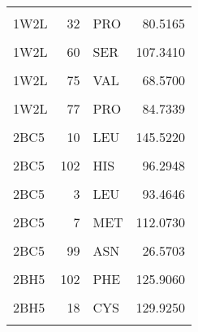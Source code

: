 \begin{table}
\begin{tabular}{lrlr}
			\cellcolor{gray!6}{1W2L} & \cellcolor{gray!6}{22} & \cellcolor{gray!6}{HIS} & \cellcolor{gray!6}{122.1140}\\
			1W2L & 32 & PRO & 80.5165\\
			\cellcolor{gray!6}{1W2L} & \cellcolor{gray!6}{34} & \cellcolor{gray!6}{PHE} & \cellcolor{gray!6}{94.2433}\\
			1W2L & 60 & SER & 107.3410\\
			\cellcolor{gray!6}{1W2L} & \cellcolor{gray!6}{61} & \cellcolor{gray!6}{ILE} & \cellcolor{gray!6}{64.6202}\\
			\addlinespace
			1W2L & 75 & VAL & 68.5700\\
			\cellcolor{gray!6}{1W2L} & \cellcolor{gray!6}{76} & \cellcolor{gray!6}{MET} & \cellcolor{gray!6}{95.5351}\\
			1W2L & 77 & PRO & 84.7339\\
			\cellcolor{gray!6}{1W2L} & \cellcolor{gray!6}{80} & \cellcolor{gray!6}{TYR} & \cellcolor{gray!6}{159.9880}\\
			2BC5 & 10 & LEU & 145.5220\\
			\addlinespace
			\cellcolor{gray!6}{2BC5} & \cellcolor{gray!6}{101} & \cellcolor{gray!6}{CYS} & \cellcolor{gray!6}{122.7380}\\
			2BC5 & 102 & HIS & 96.2948\\
			\cellcolor{gray!6}{2BC5} & \cellcolor{gray!6}{106} & \cellcolor{gray!6}{ARG} & \cellcolor{gray!6}{119.2950}\\
			2BC5 & 3 & LEU & 93.4646\\
			\cellcolor{gray!6}{2BC5} & \cellcolor{gray!6}{65} & \cellcolor{gray!6}{PHE} & \cellcolor{gray!6}{87.4034}\\
			\addlinespace
			2BC5 & 7 & MET & 112.0730\\
			\cellcolor{gray!6}{2BC5} & \cellcolor{gray!6}{98} & \cellcolor{gray!6}{CYS} & \cellcolor{gray!6}{83.1994}\\
			2BC5 & 99 & ASN & 26.5703\\
			\cellcolor{gray!6}{2BH5} & \cellcolor{gray!6}{100} & \cellcolor{gray!6}{LYS} & \cellcolor{gray!6}{174.4600}\\
			2BH5 & 102 & PHE & 125.9060\\
			\addlinespace
			\cellcolor{gray!6}{2BH5} & \cellcolor{gray!6}{15} & \cellcolor{gray!6}{CYS} & \cellcolor{gray!6}{93.4388}\\
			2BH5 & 18 & CYS & 129.9250\\
			\cellcolor{gray!6}{2BH5} & \cellcolor{gray!6}{19} & \cellcolor{gray!6}{HIS} & \cellcolor{gray!6}{122.4230}\\

\end{tabular}
\end{table}
